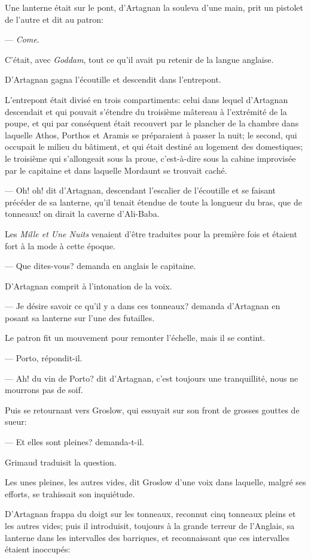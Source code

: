 Une lanterne était sur le pont, d'Artagnan la souleva d'une main, prit un pistolet de l'autre et dit au patron:

— \textit{Come}.

C'était, avec \textit{Goddam}, tout ce qu'il avait pu retenir de la langue anglaise.

D'Artagnan gagna l'écoutille et descendit dans l'entrepont.

L'entrepont était divisé en trois compartiments: celui dans lequel d'Artagnan descendait et qui pouvait s'étendre du troisième mâtereau à l'extrémité de la poupe, et qui par conséquent était recouvert par le plancher de la chambre dans laquelle Athos, Porthos et Aramis se préparaient à passer la nuit; le second, qui occupait le milieu du bâtiment, et qui était destiné au logement des domestiques; le troisième qui s'allongeait sous la proue, c'est-à-dire sous la cabine improvisée par le capitaine et dans laquelle Mordaunt se trouvait caché.

— Oh! oh! dit d'Artagnan, descendant l'escalier de l'écoutille et se faisant précéder de sa lanterne, qu'il tenait étendue de toute la longueur du bras, que de tonneaux! on dirait la caverne d'Ali-Baba.

Les \textit{Mille et Une Nuits} venaient d'être traduites pour la première fois et étaient fort à la mode à cette époque.

— Que dites-vous? demanda en anglais le capitaine.

D'Artagnan comprit à l'intonation de la voix.

— Je désire savoir ce qu'il y a dans ces tonneaux? demanda d'Artagnan en posant sa lanterne sur l'une des futailles.

Le patron fit un mouvement pour remonter l'échelle, mais il se contint.

— Porto, répondit-il.

— Ah! du vin de Porto? dit d'Artagnan, c'est toujours une tranquillité, nous ne mourrons pas de soif.

Puis se retournant vers Groslow, qui essuyait sur son front de grosses gouttes de sueur:

— Et elles sont pleines? demanda-t-il.

Grimaud traduisit la question.

Les unes pleines, les autres vides, dit Groslow d'une voix dans laquelle, malgré ses efforts, se trahissait son inquiétude.

D'Artagnan frappa du doigt sur les tonneaux, reconnut cinq tonneaux pleins et les autres vides; puis il introduisit, toujours à la grande terreur de l'Anglais, sa lanterne dans les intervalles des barriques, et reconnaissant que ces intervalles étaient inoccupés:

